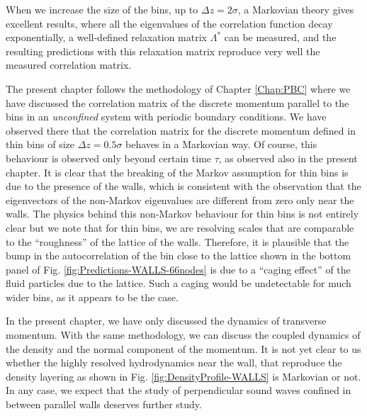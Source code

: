 \documentclass[b5paper,openright,10pt]{book}
\begin{document}
When we  increase the  size of  the bins, up  to $\Delta  z=2\sigma$, a
Markovian theory gives excellent results, where all the eigenvalues of
the   correlation  function   decay   exponentially,  a   well-defined
relaxation  matrix  $\Lambda^*$ can  be  measured,  and the  resulting
predictions  with  this  relaxation  matrix reproduce  very  well  the
measured correlation matrix.

The present chapter follows the  methodology of Chapter \ref{Chap:PBC}  where we
have  discussed  the  correlation  matrix  of  the  discrete  momentum
parallel to  the bins in  an \textit{unconfined} system  with periodic
boundary  conditions.  We  have  observed there  that the  correlation
matrix for the discrete momentum defined  in thin bins of size $\Delta
z= 0.5\sigma$ behaves in a Markovian way. Of course, this behaviour is
observed  only beyond  certain time  $\tau$, as  observed also  in the
present chapter.  It is clear that the breaking of the Markov assumption
for thin bins is due to the presence of the walls, which is consistent
with  the   observation  that  the  eigenvectors   of  the  non-Markov
eigenvalues are different  from zero only near the  walls. The physics
behind this non-Markov  behaviour for thin bins is  not entirely clear
but  we note  that for  thin bins,  we are  resolving scales  that are
comparable   to   the   ``roughness''    of   the   lattice   of   the
walls. Therefore, it is plausible that the bump in the autocorrelation
of the  bin close  to the lattice  shown in the  bottom panel  of Fig.
\ref{fig:Predictions-WALLS-66nodes} is  due to a  ``caging effect'' of the  fluid particles 
due to the lattice. Such a caging would be undetectable for much wider
bins, as it appears to be the case.

In  the  present  chapter,  we  have  only  discussed  the  dynamics  of
transverse momentum.   With the same  methodology, we can  discuss the
coupled  dynamics of  the  density  and the  normal  component of  the
momentum.   It is  not yet  clear to  us whether  the highly  resolved
hydrodynamics near  the wall, that  reproduce the density  layering as
shown in  Fig.  \ref{fig:DensityProfile-WALLS} is  Markovian or  not. In any  case, we
expect that the study of perpendicular sound waves confined in between
parallel walls deserves further study.
\end{document}
